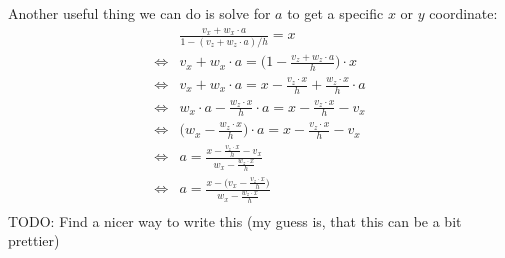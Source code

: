 \documentclass{article}
\begin{document}
Another useful thing we can do is solve for $a$ to get a specific $x$ or $y$ coordinate:
\begin{align*}
         & \frac{v_x + w_x \cdot a}{1 - (v_z + w_z \cdot a)/h} = x \\
    \iff & v_x + w_x \cdot a = \Big(1 - \frac{v_z + w_z \cdot a}{h} \Big) \cdot x \\
    \iff & v_x + w_x \cdot a = x - \frac{v_z \cdot x}{h} + \frac{w_z \cdot x}{h} \cdot a \\
    \iff & w_x \cdot a - \frac{w_z \cdot x }{h} \cdot a = x - \frac{v_z \cdot x}{h} - v_x \\
    \iff & \Big( w_x - \frac{w_z \cdot x }{h} \Big) \cdot a = x - \frac{v_z \cdot x}{h} - v_x \\
    \iff & a = \frac{x - \frac{v_z \cdot x}{h} - v_x}{w_x - \frac{w_z \cdot x}{h}} \\
    \iff & a = \frac{x - \Big( v_x - \frac{v_z \cdot x}{h} \Big)}{w_x - \frac{w_z \cdot x}{h}} \\
\end{align*}
TODO: Find a nicer way to write this (my guess is, that this can be a bit prettier)
\end{document}
